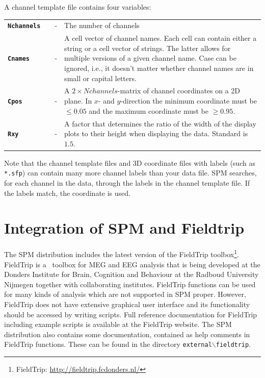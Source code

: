 A channel template file contains four variables:\\

\begin{tabular}{llcp{9cm}}

{\bf \texttt{Nchannels}} & &  - & The number of channels\\

{\bf \texttt{Cnames}}&  & - & A cell vector of channel names. Each cell can contain either a string or a cell vector of strings. The latter allows
for multiple versions of a given channel name. Case can be ignored, i.e., it doesn't matter whether channel names are in small or capital letters.\\

{\bf \texttt{Cpos}} & & - & A $2 \times Nchannels$-matrix of channel coordinates on a 2D plane. In $x$- and $y$-direction the minimum coordinate must be $\leq 0.05$ and the maximum coordinate must be $\geq 0.95$. \\

{\bf \texttt{Rxy}} & & - & A factor that determines the ratio of the width of the display plots to their height when displaying the data. Standard is $1.5$. \\

\end{tabular}

Note that the channel template files and 3D coordinate files with labels (such as \texttt{*.sfp}) can contain many more channel labels than your data file. SPM searches, for each channel in the data, through the labels in the channel template file. If the labels match, the coordinate is used.

\section{Integration of SPM and Fieldtrip}
The SPM distribution includes the latest version of the FieldTrip toolbox\footnote{FieldTrip: \url{http://fieldtrip.fcdonders.nl/}}. FieldTrip is a \matlab\ toolbox for MEG and EEG analysis that is being developed at the Donders Institute for Brain, Cognition and Behaviour at the Radboud University Nijmegen together with collaborating institutes. FieldTrip functions can be used for many kinds of analysis which are not supported in SPM proper. However, FieldTrip does not have extensive graphical user interface and its functionality should be accessed by writing scripts. Full reference documentation for FieldTrip including example scripts is available at the FieldTrip website. The SPM distribution also contains some documentation, contained as help comments in FieldTrip functions. These can be found in the directory \texttt{external$\backslash$fieldtrip}. 

